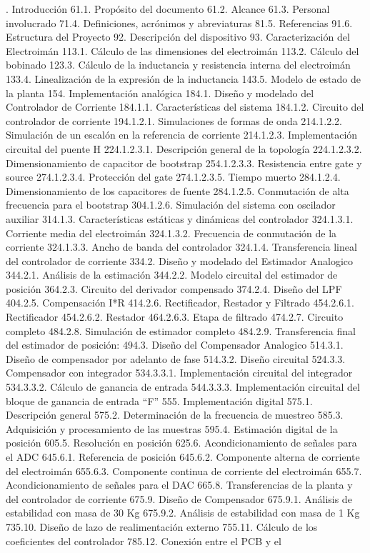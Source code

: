\documentclass{article} %
\begin{document}
. Introducci\'{o}n 61.1. Prop\'{o}sito del documento 61.2. Alcance 61.3. Personal involucrado 71.4. Definiciones, acr\'{o}nimos y abreviaturas 81.5. Referencias 91.6. Estructura del Proyecto 92. Descripci\'{o}n del dispositivo 93. Caracterizaci\'{o}n del Electroim\'{a}n 113.1. C\'{a}lculo de las dimensiones del electroim\'{a}n 113.2. C\'{a}lculo del bobinado 123.3. C\'{a}lculo de la inductancia y resistencia interna del electroim\'{a}n 133.4. Linealizaci\'{o}n de la expresi\'{o}n de la inductancia 143.5. Modelo de estado de la planta 154. Implementaci\'{o}n anal\'{o}gica 184.1. Dise\~{n}o y modelado del Controlador de Corriente 184.1.1. Caracter\'{i}sticas del sistema 184.1.2. Circuito del controlador de corriente 194.1.2.1. Simulaciones de formas de onda 214.1.2.2. Simulaci\'{o}n de un escal\'{o}n en la referencia de corriente 214.1.2.3. Implementaci\'{o}n circuital del puente H 224.1.2.3.1. Descripci\'{o}n general de la topolog\'{i}a 224.1.2.3.2. Dimensionamiento de capacitor de bootstrap 254.1.2.3.3. Resistencia entre gate y source 274.1.2.3.4. Protecci\'{o}n del gate 274.1.2.3.5. Tiempo muerto 284.1.2.4. Dimensionamiento de los capacitores de fuente 284.1.2.5. Conmutaci\'{o}n de alta frecuencia para el bootstrap 304.1.2.6. Simulaci\'{o}n del sistema con oscilador auxiliar 314.1.3. Caracter\'{i}sticas est\'{a}ticas y din\'{a}micas del controlador 324.1.3.1. Corriente media del electroim\'{a}n 324.1.3.2. Frecuencia de conmutaci\'{o}n de la corriente 324.1.3.3. Ancho de banda del controlador 324.1.4. Transferencia lineal del controlador de corriente 334.2. Dise\~{n}o y modelado del Estimador Analogico 344.2.1. An\'{a}lisis de la estimaci\'{o}n 344.2.2. Modelo circuital del estimador de posici\'{o}n 364.2.3. Circuito del derivador compensado 374.2.4. Dise\~{n}o del LPF 404.2.5. Compensaci\'{o}n I*R 414.2.6. Rectificador, Restador y Filtrado 454.2.6.1. Rectificador 454.2.6.2. Restador 464.2.6.3. Etapa de filtrado 474.2.7. Circuito completo 484.2.8. Simulaci\'{o}n de estimador completo 484.2.9. Transferencia final del estimador de posici\'{o}n: 494.3. Dise\~{n}o del Compensador Analogico 514.3.1. Dise\~{n}o de compensador por adelanto de fase 514.3.2. Dise\~{n}o circuital 524.3.3. Compensador con integrador 534.3.3.1. Implementaci\'{o}n circuital del integrador 534.3.3.2. C\'{a}lculo de ganancia de entrada 544.3.3.3. Implementaci\'{o}n circuital del bloque de ganancia de entrada ``F'' 555. Implementaci\'{o}n digital 575.1. Descripci\'{o}n general 575.2. Determinaci\'{o}n de la frecuencia de muestreo 585.3. Adquisici\'{o}n y procesamiento de las muestras 595.4. Estimaci\'{o}n digital de la posici\'{o}n 605.5. Resoluci\'{o}n en posici\'{o}n 625.6. Acondicionamiento de se\~{n}ales para el ADC 645.6.1. Referencia de posici\'{o}n 645.6.2. Componente  alterna de corriente del electroim\'{a}n 655.6.3. Componente  continua de corriente del electroim\'{a}n 655.7. Acondicionamiento de se\~{n}ales para el DAC 665.8. Transferencias de la planta y del controlador de corriente 675.9. Dise\~{n}o de Compensador 675.9.1. An\'{a}lisis de estabilidad con masa de 30 Kg 675.9.2. An\'{a}lisis de estabilidad con masa de 1 Kg 735.10.  Dise\~{n}o de lazo de realimentaci\'{o}n externo 755.11.  C\'{a}lculo de los coeficientes del controlador 785.12.  Conexi\'{o}n entre el PCB y el 
\end{document}
